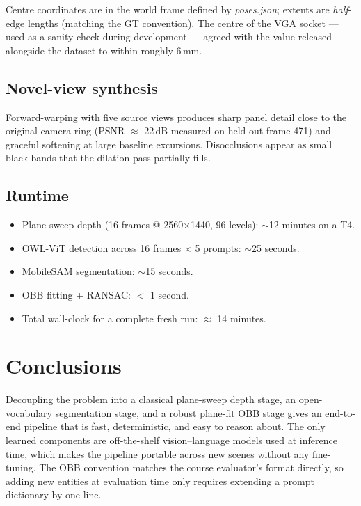 \documentclass[11pt,a4paper]{article}
\begin{document}
Centre coordinates are in the world frame defined by \textit{poses.json}; extents are \textit{half}-edge lengths (matching the GT convention). The centre of the VGA socket --- used as a sanity check during development --- agreed with the value released alongside the dataset to within roughly 6\,mm.

\subsection{Novel-view synthesis}

Forward-warping with five source views produces sharp panel detail close to the original camera ring (PSNR $\approx$ 22\,dB measured on held-out frame 471) and graceful softening at large baseline excursions. Disocclusions appear as small black bands that the dilation pass partially fills.

\subsection{Runtime}

\begin{itemize}[leftmargin=1em,itemsep=0.1em]
    \item Plane-sweep depth (16 frames @ 2560×1440, 96 levels): $\sim$12 minutes on a T4.
    \item OWL-ViT detection across 16 frames $\times$ 5 prompts: $\sim$25 seconds.
    \item MobileSAM segmentation: $\sim$15 seconds.
    \item OBB fitting + RANSAC: $<$ 1 second.
    \item Total wall-clock for a complete fresh run: $\approx$ 14 minutes.
\end{itemize}

\section{Conclusions}

Decoupling the problem into a classical plane-sweep depth stage, an open-vocabulary segmentation stage, and a robust plane-fit OBB stage gives an end-to-end pipeline that is fast, deterministic, and easy to reason about. The only learned components are off-the-shelf vision--language models used at inference time, which makes the pipeline portable across new scenes without any fine-tuning. The OBB convention matches the course evaluator's format directly, so adding new entities at evaluation time only requires extending a prompt dictionary by one line.
\end{document}
